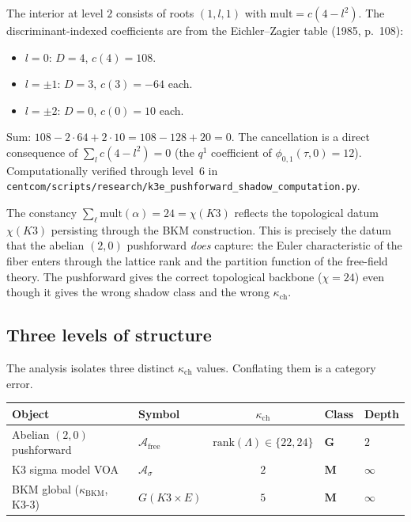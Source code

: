 \documentclass[11pt]{article}
\newcommand{\cA}{\mathcal{A}}
\newcommand{\mult}{\mathrm{mult}}
\begin{document}
\begin{remark}
\label{rem:level-2-cancellation}
The interior at level $2$ consists of roots $(1, l, 1)$ with $\mult = c(4 - l^2)$. The discriminant-indexed coefficients are from the Eichler--Zagier table (1985, p.~108):
\begin{itemize}
 \item $l = 0$: $D = 4$, $c(4) = 108$.
 \item $l = \pm 1$: $D = 3$, $c(3) = -64$ each.
 \item $l = \pm 2$: $D = 0$, $c(0) = 10$ each.
\end{itemize}
Sum: $108 - 2 \cdot 64 + 2 \cdot 10 = 108 - 128 + 20 = 0$. The cancellation is a direct consequence of $\sum_l c(4 - l^2) = 0$ (the $q^1$ coefficient of $\phi_{0,1}(\tau, 0) = 12$). Computationally verified through level~$6$ in \texttt{centcom/scripts/research/k3e\_pushforward\_shadow\_computation.py}.
\end{remark}

\begin{remark}
\label{rem:constancy-shadow}
The constancy $\sum_\ell \mult(\alpha) = 24 = \chi(K3)$ reflects the topological datum $\chi(K3)$ persisting through the BKM construction. This is precisely the datum that the abelian $(2,0)$ pushforward \emph{does} capture: the Euler characteristic of the fiber enters through the lattice rank and the partition function of the free-field theory. The pushforward gives the correct topological backbone ($\chi = 24$) even though it gives the wrong shadow class and the wrong $\kappa_{\mathrm{ch}}$.
\end{remark}

\subsection{Three levels of structure}
\label{subsec:three-levels}

The analysis isolates three distinct $\kappa_{\mathrm{ch}}$ values. Conflating them is a category error.

\begin{center}
\renewcommand{\arraystretch}{1.3}
\begin{tabular}{llcll}
 \toprule
 \textbf{Object} & \textbf{Symbol} & $\kappa_{\mathrm{ch}}$ & \textbf{Class} & \textbf{Depth} \\
 \midrule
 Abelian $(2,0)$ pushforward & $\cA_{\mathrm{free}}$ & $\mathrm{rank}(\Lambda) \in \{22, 24\}$ & $\mathbf{G}$ & $2$ \\
 K3 sigma model VOA & $\cA_\sigma$ & $2$ & $\mathbf{M}$ & $\infty$ \\
 BKM global ($\kappa_{\mathrm{BKM}}$, K3-3) & $G(K3 \times E)$ & $5$ & $\mathbf{M}$ & $\infty$ \\
 \bottomrule
\end{tabular}
\end{center}
\end{document}
